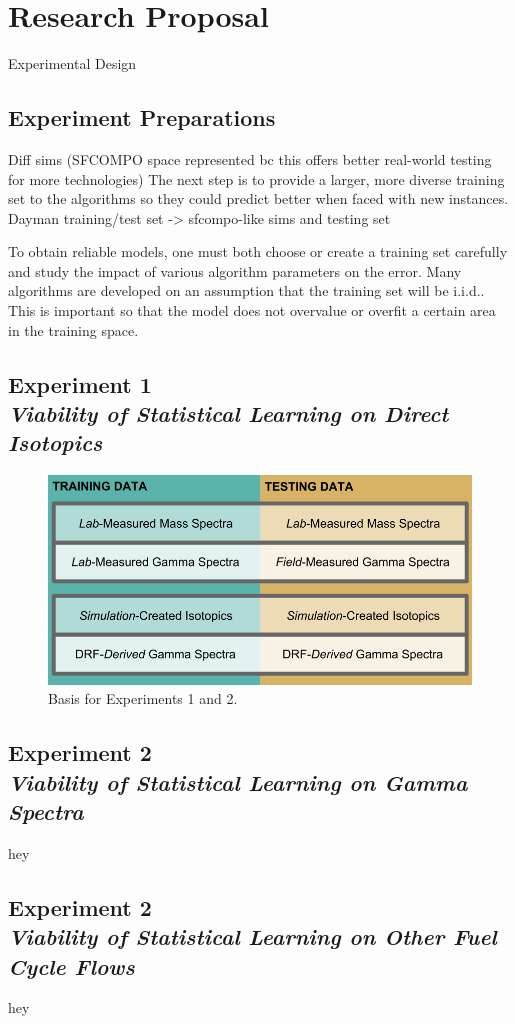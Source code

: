 \chapter{Research Proposal}
\label{ch:proposal}

Experimental Design

\section{Experiment Preparations}
\label{sec:prep}

Diff sims (SFCOMPO space represented bc this offers better real-world testing for more technologies)
The next step is to provide a larger, more diverse training set to the
algorithms so they could predict better when faced with new instances.  Dayman
training/test set -> sfcompo-like sims and testing set

To obtain reliable models, one must both choose or create a training set
carefully and study the impact of various algorithm parameters on the error.
Many algorithms are developed on an assumption that the training set will be \gls{i.i.d.}.
This is important so that the
model does not overvalue or overfit a certain area in the training space. 



\section[Experiment 1: Direct Isotopics]{Experiment 1\\ {\textit{Viability of Statistical Learning on Direct Isotopics}}}
\label{sec:exp1}

\begin{figure}[!htb]
    \centering
    \includegraphics[width=\linewidth]{./chapters/proposal/proposal.png}
    \caption{Basis for Experiments 1 and 2.}
    \label{fig:proposal}
\end{figure}


\section[Experiment 2: Gamma Spectra]{Experiment 2\\ {\textit{Viability of Statistical Learning on Gamma Spectra}}}
\label{sec:exp2}

hey

\section[Experiment 3: Other Fuel Cycle Flows]{Experiment 2\\ {\textit{Viability of Statistical Learning on Other Fuel Cycle Flows}}}
\label{sec:exp3}

hey
